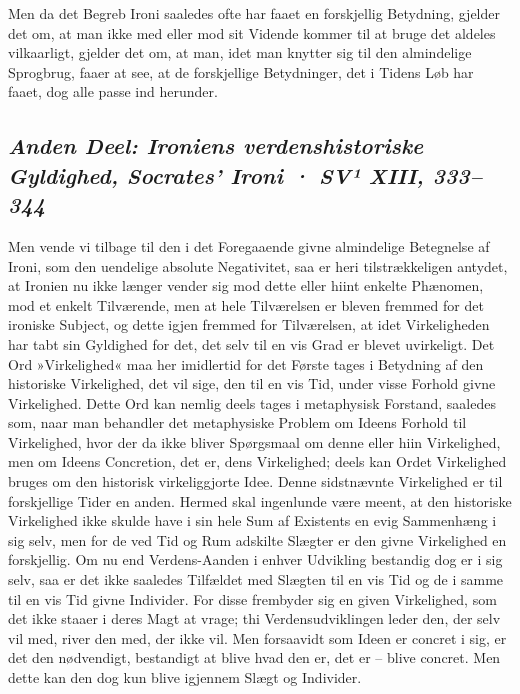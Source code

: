 \documentclass[12pt,a4paper]{article}
\newcommand{\sectionheading}[1]{\subsection*{\normalfont\itshape #1}}
\begin{document}
Men da det Begreb Ironi saaledes ofte har faaet en forskjellig Betydning, gjelder det om, at man ikke med eller mod sit Vidende kommer til at bruge det aldeles vilkaarligt, gjelder det om, at man, idet man knytter sig til den almindelige Sprogbrug, faaer at see, at de forskjellige Betydninger, det i Tidens Løb har faaet, dog alle passe ind herunder.

\sectionheading{Anden Deel: Ironiens verdenshistoriske Gyldighed, Socrates' Ironi  ·  SV¹ XIII, 333–344}

Men vende vi tilbage til den i det Foregaaende givne almindelige Betegnelse af Ironi, som den uendelige absolute Negativitet, saa er heri tilstrækkeligen antydet, at Ironien nu ikke længer vender sig mod dette eller hiint enkelte Phænomen, mod et enkelt Tilværende, men at hele Tilværelsen er bleven fremmed for det ironiske Subject, og dette igjen fremmed for Tilværelsen, at idet Virkeligheden har tabt sin Gyldighed for det, det selv til en vis Grad er blevet uvirkeligt. Det Ord »Virkelighed« maa her imidlertid for det Første tages i Betydning af den historiske Virkelighed, det vil sige, den til en vis Tid, under visse Forhold givne Virkelighed. Dette Ord kan nemlig deels tages i metaphysisk Forstand, saaledes som, naar man behandler det metaphysiske Problem om Ideens Forhold til Virkelighed, hvor der da ikke bliver Spørgsmaal om denne eller hiin Virkelighed, men om Ideens Concretion, det er, dens Virkelighed; deels kan Ordet Virkelighed bruges om den historisk virkeliggjorte Idee. Denne sidstnævnte Virkelighed er til forskjellige Tider en anden. Hermed skal ingenlunde være meent, at den historiske Virkelighed ikke skulde have i sin hele Sum af Existents en evig Sammenhæng i sig selv, men for de ved Tid og Rum adskilte Slægter er den givne Virkelighed en forskjellig. Om nu end Verdens-Aanden i enhver Udvikling bestandig dog er i sig selv, saa er det ikke saaledes Tilfældet med Slægten til en vis Tid og de i samme til en vis Tid givne Individer. For disse frembyder sig en given Virkelighed, som det ikke staaer i deres Magt at vrage; thi Verdensudviklingen leder den, der selv vil med, river den med, der ikke vil. Men forsaavidt som Ideen er concret i sig, er det den nødvendigt, bestandigt at blive hvad den er, det er – blive concret. Men dette kan den dog kun blive igjennem Slægt og Individer.
\end{document}
